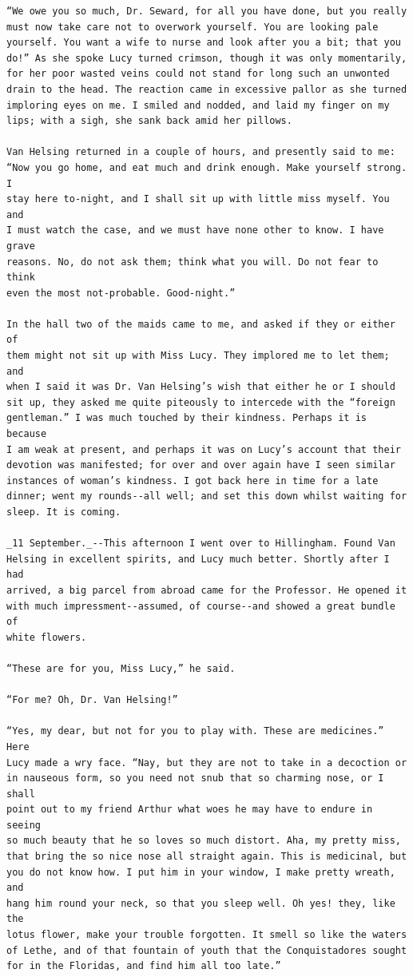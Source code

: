 \documentclass{article}
\begin{document}
\begin{verbatim}
“We owe you so much, Dr. Seward, for all you have done, but you really
must now take care not to overwork yourself. You are looking pale
yourself. You want a wife to nurse and look after you a bit; that you
do!” As she spoke Lucy turned crimson, though it was only momentarily,
for her poor wasted veins could not stand for long such an unwonted
drain to the head. The reaction came in excessive pallor as she turned
imploring eyes on me. I smiled and nodded, and laid my finger on my
lips; with a sigh, she sank back amid her pillows.

Van Helsing returned in a couple of hours, and presently said to me:
“Now you go home, and eat much and drink enough. Make yourself strong. I
stay here to-night, and I shall sit up with little miss myself. You and
I must watch the case, and we must have none other to know. I have grave
reasons. No, do not ask them; think what you will. Do not fear to think
even the most not-probable. Good-night.”

In the hall two of the maids came to me, and asked if they or either of
them might not sit up with Miss Lucy. They implored me to let them; and
when I said it was Dr. Van Helsing’s wish that either he or I should
sit up, they asked me quite piteously to intercede with the “foreign
gentleman.” I was much touched by their kindness. Perhaps it is because
I am weak at present, and perhaps it was on Lucy’s account that their
devotion was manifested; for over and over again have I seen similar
instances of woman’s kindness. I got back here in time for a late
dinner; went my rounds--all well; and set this down whilst waiting for
sleep. It is coming.

_11 September._--This afternoon I went over to Hillingham. Found Van
Helsing in excellent spirits, and Lucy much better. Shortly after I had
arrived, a big parcel from abroad came for the Professor. He opened it
with much impressment--assumed, of course--and showed a great bundle of
white flowers.

“These are for you, Miss Lucy,” he said.

“For me? Oh, Dr. Van Helsing!”

“Yes, my dear, but not for you to play with. These are medicines.” Here
Lucy made a wry face. “Nay, but they are not to take in a decoction or
in nauseous form, so you need not snub that so charming nose, or I shall
point out to my friend Arthur what woes he may have to endure in seeing
so much beauty that he so loves so much distort. Aha, my pretty miss,
that bring the so nice nose all straight again. This is medicinal, but
you do not know how. I put him in your window, I make pretty wreath, and
hang him round your neck, so that you sleep well. Oh yes! they, like the
lotus flower, make your trouble forgotten. It smell so like the waters
of Lethe, and of that fountain of youth that the Conquistadores sought
for in the Floridas, and find him all too late.”


\end{verbatim}
\end{document}
